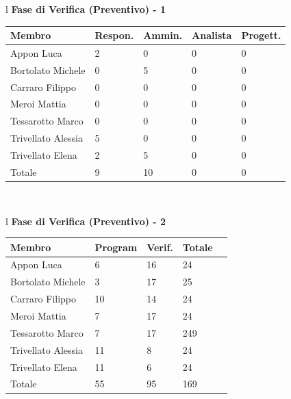 \documentclass[11pt,titlepage,a4paper]{report}
\begin{document}
\begin{table}[hbtp]
\large{
\begin{tabular}{l}
\Large{\textbf{\textsf{Fase di Verifica (Preventivo) - 1}}} \\
\begin{tabular}{||p{3.5cm}||p{2cm}||p{2cm}||p{2cm}||p{2cm}||}
\hline
\textbf{Membro} & \textbf{Respon.} & \textbf{Ammin.} & \textbf{Analista}
& \textbf{Progett.}\\
\hline
{Appon Luca}&2&0&0&0 \\ 
\hline 
{Bortolato Michele} &0&5&0&0\\ 
\hline
{Carraro Filippo}&0&0&0&0 \\
\hline
{Meroi Mattia}&0&0&0&0\\
\hline
{Tessarotto Marco} &0&0&0&0\\
\hline
{Trivellato Alessia} &5&0&0&0 \\
\hline
{Trivellato Elena} &2&5&0&0 \\
\hline
{Totale}& 9&10&0&0 \\
\hline
\end{tabular} \\
\end{tabular}
}
\end{table}

\begin{table}[hbtp]
\large{
\begin{tabular}{l}
\Large{\textbf{\textsf{Fase di Verifica (Preventivo) - 2}}} \\
\begin{tabular}{||p{3.5cm}||p{2cm}||p{2cm}||p{2cm}||p{2cm}||}
\hline
\textbf{Membro} & \textbf{Program} & \textbf{Verif.} & \textbf{Totale}\\
\hline
{Appon Luca}&6&16&24 \\ 
\hline 
{Bortolato Michele} &3&17&25\\ 
\hline
{Carraro Filippo}&10&14&24 \\
\hline
{Meroi Mattia}&7&17&24\\
\hline
{Tessarotto Marco} &7&17&249\\
\hline
{Trivellato Alessia} &11&8&24 \\
\hline
{Trivellato Elena} &11&6&24 \\
\hline
{Totale} &55&95&169 \\
\hline
\end{tabular} \\
\end{tabular}
}
\end{table}
\end{document}
